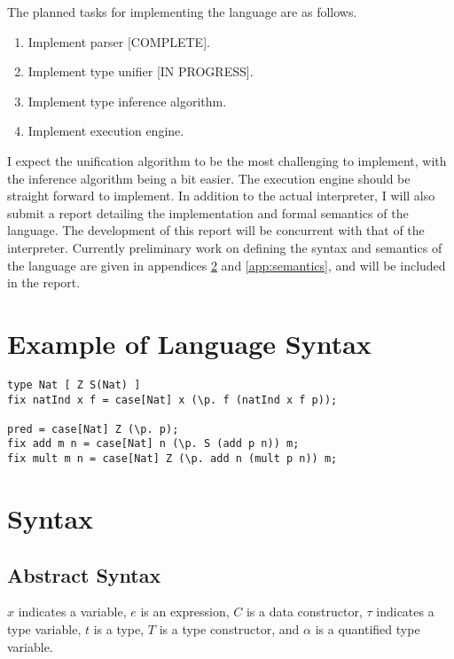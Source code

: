 \documentclass[12pt]{article}
\begin{document}
The planned tasks for implementing the language are as follows.
\begin{enumerate}
\item Implement parser [COMPLETE].

\item Implement type unifier [IN PROGRESS].

\item Implement type inference algorithm.

\item Implement execution engine.
\end{enumerate}
I expect the unification algorithm to be the most challenging to
implement, with the inference algorithm being a bit easier.
The execution engine should be straight forward to implement.
In addition to the actual interpreter, I will also submit a report
detailing the implementation and formal semantics of the language.
The development of this report will be concurrent with that of the
interpreter.
Currently preliminary work on defining the syntax and semantics of the
language are given in appendices \ref{app:syntax} and
\ref{app:semantics}, and will be included in the report.


\section{Example of Language Syntax}
\label{sec:example}

\begin{verbatim}
type Nat [ Z S(Nat) ]
fix natInd x f = case[Nat] x (\p. f (natInd x f p));

pred = case[Nat] Z (\p. p);
fix add m n = case[Nat] n (\p. S (add p n)) m;
fix mult m n = case[Nat] Z (\p. add n (mult p n)) m;
\end{verbatim}


\printbibliography


\pagebreak


\section{Syntax}
\label{app:syntax}

\subsection{Abstract Syntax}

$x$ indicates a variable, $e$ is an expression, $C$ is a data
constructor, $\tau$ indicates a type variable, $t$ is a type, $T$ is a
type constructor, and $\alpha$ is a quantified type variable.
\end{document}
